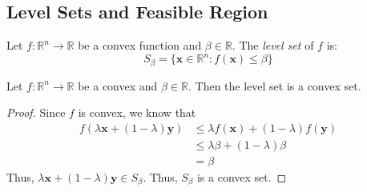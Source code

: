 \subsection{Level Sets and Feasible Region}
\begin{defbox}
    \begin{definition}
        Let $ f:\mathbb{R}^n\to\mathbb{R} $ be a convex function
        and $ \beta\in\mathbb{R} $. The \emph{level set}
        of $ f $ is:
        \[ S_\beta = \{\bm{x}\in\mathbb{R}^n:f(\bm{x})\leqslant \beta\} \]
    \end{definition}
\end{defbox}

\begin{thmbox}
    \begin{theorem}
        Let $ f:\mathbb{R}^n\to\mathbb{R} $ be a convex and $ \beta\in\mathbb{R} $. Then the level set
        is a convex set.
    \end{theorem}
\end{thmbox}

\begin{proof}
    Since $ f $ is convex, we know that
    \begin{align*}
        f(\lambda\bm{x} + (1-\lambda)\bm{y})
         & \leqslant \lambda f(\bm{x})+(1-\lambda)f(\bm{y}) \\
         & \leqslant\lambda\beta + (1-\lambda)\beta         \\
         & =\beta
    \end{align*}
    Thus, $ \lambda \bm{x} + (1-\lambda)\bm{y}\in S_\beta $. Thus, $ S_\beta $ is a convex
    set.
\end{proof}